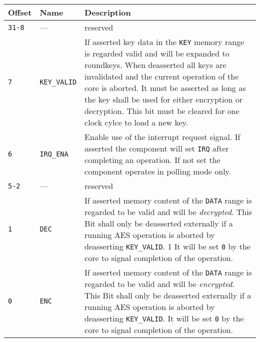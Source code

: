 \documentclass{ruschidoc}
\begin{document}
\begin{tabularx}{\textwidth}{|p{13mm}|p{18mm} |X|}
  \hline
  \bf{Offset} 	  & \bf{Name} & \bf{Description}\\ \hline
  \texttt{31-8} & --- & reserved \\ \hline 	 
  \texttt{7} 	 &\texttt{KEY\_VALID} &If asserted key data in the \texttt{KEY} memory range is regarded valid and will be expanded to roundkeys. 
	When deasserted all keys are invalidated and the current operation of the core is aborted. It must be asserted as long as the key shall be 
	used for either encryption or decryption. This bit must be cleared for one clock cylce to load a new key. \\ \hline
  \texttt{6}   & \texttt{IRQ\_ENA}  & Enable use of the interrupt request signal. If asserted the component will set \texttt{IRQ} after 
					completing an operation. If not set the component operates in polling mode only.\\ \hline	 
  \texttt{5-2}   & --- &reserved  \\ \hline	 
  \texttt{1} 	&  \texttt{DEC} \footnotemark[1] &  If asserted memory content of the \texttt{DATA} range is regarded to be valid and will be 
	\emph{decrypted}. This Bit shall only be deasserted externally if a running AES operation is aborted by deasserting \texttt{KEY\_VALID}. 1
	It will be set \texttt{0} by the core to signal completion of the operation.\\ \hline	 
  \texttt{0} 	&  \texttt{ENC} \footnotemark[1] & If asserted memory content of the \texttt{DATA} range is regarded to be valid and will be 
	\emph{encrypted}. This Bit shall only be deasserted externally if a running AES operation is aborted by deasserting \texttt{KEY\_VALID}.
	 It will be set \texttt{0} by the core to signal completion of the operation. \\ \hline	 
\end{tabularx}
\label{tab:ctrlreg}
\end{document}
